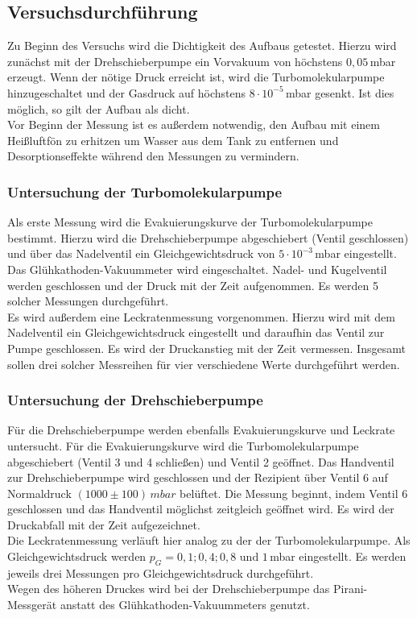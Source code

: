 \subsection{Versuchsdurchführung}
Zu Beginn des Versuchs wird die Dichtigkeit des Aufbaus getestet. Hierzu wird zunächst mit der Drehschieberpumpe ein Vorvakuum von höchstens $0,05$\,\si{\milli\bar} erzeugt. Wenn der nötige Druck erreicht
ist, wird die Turbomolekularpumpe hinzugeschaltet und der Gasdruck auf höchstens $8 \cdot 10^{-5}$\,\si{\milli\bar} gesenkt. Ist dies möglich, so gilt der Aufbau als dicht.\\
Vor Beginn der Messung ist es außerdem notwendig, den Aufbau mit einem Heißluftfön zu erhitzen um Wasser aus dem Tank zu entfernen und Desorptionseffekte während den Messungen zu vermindern.
\subsubsection{Untersuchung der Turbomolekularpumpe}
Als erste Messung wird die Evakuierungskurve der Turbomolekularpumpe bestimmt. Hierzu wird die Drehschieberpumpe abgeschiebert (Ventil geschlossen) und über das Nadelventil ein Gleichgewichtsdruck von
$5 \cdot 10^{-3}$\,\si{\milli\bar} eingestellt. Das Glühkathoden-Vakuummeter wird eingeschaltet. Nadel- und Kugelventil werden geschlossen und der Druck mit der Zeit aufgenommen. Es werden 5 solcher Messungen
durchgeführt.\\
Es wird außerdem eine Leckratenmessung vorgenommen. Hierzu wird mit dem Nadelventil ein Gleichgewichtsdruck eingestellt und daraufhin das Ventil zur Pumpe geschlossen. Es wird
der Druckanstieg mit der Zeit vermessen. Insgesamt sollen drei solcher Messreihen für vier verschiedene Werte durchgeführt werden.
\subsubsection{Untersuchung der Drehschieberpumpe}
Für die Drehschieberpumpe werden ebenfalls Evakuierungskurve und Leckrate untersucht. Für die Evakuierungskurve wird die Turbomolekularpumpe abgeschiebert (Ventil 3 und 4 schließen) und Ventil 2 geöffnet.
Das Handventil zur Drehschieberpumpe wird geschlossen und der Rezipient über Ventil 6 auf Normaldruck $(1000 \pm 100)\,  \si{mbar}$ belüftet. Die Messung beginnt, indem Ventil 6 geschlossen und das Handventil
möglichst zeitgleich geöffnet wird. Es wird der Druckabfall mit der Zeit aufgezeichnet.\\
Die Leckratenmessung verläuft hier analog zu der der Turbomolekularpumpe. Als Gleichgewichtsdruck werden  $p_G=0,1;0,4;0,8 \text{ und } 1 $\,\si{\milli\bar} eingestellt. Es werden jeweils drei Messungen
pro Gleichgewichtsdruck durchgeführt.\\
Wegen des höheren Druckes wird bei der Drehschieberpumpe das Pirani-Messgerät anstatt des Glühkathoden-Vakuummeters genutzt.
\newpage
